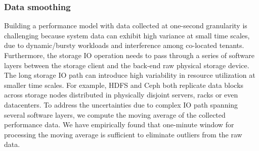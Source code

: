 
\subsubsection{Data smoothing}
%
Building a performance model with data collected at one-second granularity is challenging because 
system data can exhibit high variance at small time scales, \eg due to dynamic/bursty workloads and interference among co-located tenants.
Furthermore, the storage IO operation needs to pass through a series of software layers 
between the storage client and the back-end raw physical storage device. 
The long storage IO path can introduce high variability in resource utilization at smaller time scales. 
For example, HDFS and Ceph both replicate data blocks across storage nodes distributed in physically disjoint 
servers, racks or even datacenters.
To address the uncertainties due to complex IO path spanning several software layers, 
we compute the moving average of the collected performance data.
We have empirically found that one-minute window for processing the moving average is sufficient to 
eliminate outliers from the raw data.


